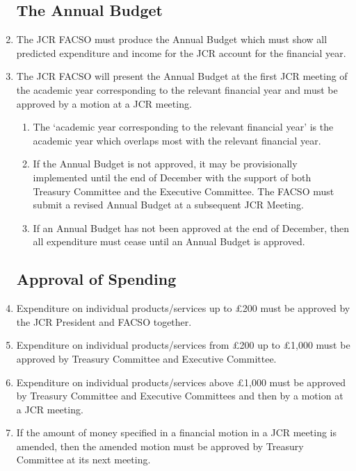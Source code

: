 \documentclass[12pt]{article}
\begin{document}
\begin{enumerate}
    \subsection{The Annual Budget}
    \item The JCR FACSO must produce the Annual Budget which must show all predicted expenditure and income for the JCR account for the financial year.
    \item The JCR FACSO will present the Annual Budget at the first JCR meeting of the academic year corresponding to the relevant financial year and must be approved by a motion at a JCR meeting.
    \begin{enumerate}
        \item The ‘academic year corresponding to the relevant financial year’ is the academic year which overlaps most with the relevant financial year.
        \item If the Annual Budget is not approved, it may be provisionally implemented until the end of December with the support of both Treasury Committee and the Executive Committee. The FACSO must submit a revised Annual Budget at a subsequent JCR Meeting.
        \item If an Annual Budget has not been approved at the end of December, then all expenditure must cease until an Annual Budget is approved.
    \end{enumerate}
    \subsection{Approval of Spending}
    \item Expenditure on individual products/services up to £200 must be approved by the JCR President and FACSO together.
    \item Expenditure on individual products/services from £200 up to £1,000 must be approved by Treasury Committee and Executive Committee.
    \item Expenditure on individual products/services above £1,000 must be approved by Treasury Committee and Executive Committees and then by a motion at a JCR meeting.
    \item If the amount of money specified in a financial motion in a JCR meeting is amended, then the amended motion must be approved by Treasury Committee at its next meeting.

\end{enumerate}
\end{document}
